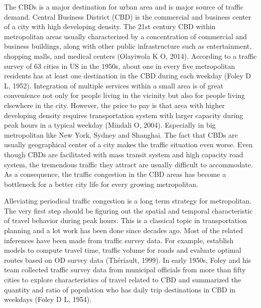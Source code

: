 \documentclass[hidelinks,12pt]{article}
\begin{document}
	The CBDs is a major destination for urban area and is major source of traffic demand.  Central Business District (CBD) is the commercial and business center of a city with high developing density. The 21st century CBD within metropolitan areas usually characterized by a concentration of commercial and business buildings, along with other public infrastructure such as entertainment, shopping malls, and medical centers (Olayiwola K O, 2014). According to a traffic survey of 63 cities in US in the 1950s, about one in every five metropolitan residents has at least one destination in the CBD during each weekday (Foley D L, 1952). Integration of multiple services within a small area is of great convenience not only for people living in the vicinity but also for people living elsewhere in the city. However, the price to pay is that area with higher developing density requires transportation system with larger capacity during peak hours in a typical weekday (Mindali O, 2004). Especially in big metropolitan like New York, Sydney and Shanghai. The fact that CBDs are usually geographical center of a city makes the traffic situation even worse. Even though CBDs are facilitated with mass transit system and high capacity road system, the tremendous traffic they attract are usually difficult to accommodate. As a consequence, the traffic congestion in the CBD areas has become a bottleneck for a better city life for every growing metropolitan.
	
	Alleviating periodical traffic congestion is a long term strategy for metropolitan. The very first step should be figuring out the spatial and temporal characteristic of travel behavior during peak hours. This is a classical topic in transportation planning and a lot work has been done since decades ago. Most of the related inferences have been made from traffic survey data. For example, establish models to compute travel time, traffic volume for roads and evaluate optimal routes based on OD survey data (Thériault, 1999).  In early 1950s, Foley and his team collected traffic survey data from municipal officials from more than fifty cities to explore characteristics of travel related to CBD and summarized the quantity and ratio of population who has daily trip destinations in CBD in weekdays (Foley D L, 1954). 
	
\end{document}
